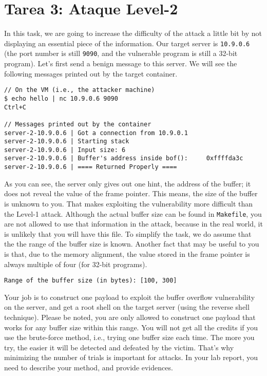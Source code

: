 \section{Tarea 3: Ataque Level-2} 

In this task, we are going to increase the difficulty
of the attack a little bit by not displaying an essential 
piece of the information. Our target server is 
\texttt{10.9.0.6} (the port number is still \texttt{9090}, and the 
vulnerable program is still a 32-bit program). 
Let's first send a benign message to this server. 
We will see the following messages printed out by the target container. 

\begin{lstlisting}
// On the VM (i.e., the attacker machine)
$ echo hello | nc 10.9.0.6 9090
Ctrl+C

// Messages printed out by the container
server-2-10.9.0.6 | Got a connection from 10.9.0.1
server-2-10.9.0.6 | Starting stack
server-2-10.9.0.6 | Input size: 6
server-2-10.9.0.6 | Buffer's address inside bof():     0xffffda3c
server-2-10.9.0.6 | ==== Returned Properly ====
\end{lstlisting}
 
As you can see, the server only gives out one hint, the 
address of the buffer; it does not reveal the value of the 
frame pointer. This means, the size of the buffer is unknown
to you. That makes exploiting the vulnerability more 
difficult than the Level-1 attack. 
Although the actual buffer size can be found in 
\texttt{Makefile}, you are not allowed to use that 
information in the attack, because in the real world, it is 
unlikely that you will have this file. 
To simplify the task, we do assume that the
the range of the buffer size is known.
Another fact that
may be useful to you is that, due to the memory alignment,
the value stored in the
frame pointer is always multiple of four (for 32-bit programs).


\begin{lstlisting}
Range of the buffer size (in bytes): [100, 300]
\end{lstlisting}
 

Your job is to construct one payload to exploit the buffer overflow
vulnerability on the server, and get a root shell on the target server (using
the reverse shell technique). Please be noted, you are only allowed 
to construct one payload that works for any buffer size 
within this range.  You will not get all the credits if you 
use the brute-force method, i.e., trying one buffer size
each time. The more you try, the easier it will be detected 
and defeated by the victim. That's why minimizing the number 
of trials is important for attacks. 
In your lab report, you need to describe your method, 
and provide evidences.



